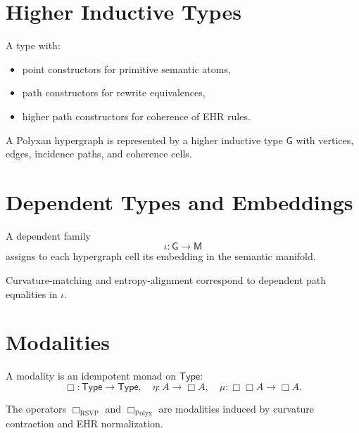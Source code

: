 \section{Higher Inductive Types}

\begin{definition}
A type with:
\begin{itemize}
\item point constructors for primitive semantic atoms,
\item path constructors for rewrite equivalences,
\item higher path constructors for coherence of EHR rules.
\end{itemize}
\end{definition}

\begin{proposition}
A Polyxan hypergraph is represented by a higher inductive type $\mathsf{G}$ with vertices, edges, incidence paths, and coherence cells.
\end{proposition}

\section{Dependent Types and Embeddings}

\begin{definition}
A dependent family
\[
\iota : \mathsf{G} \to \mathsf{M}
\]
assigns to each hypergraph cell its embedding in the semantic manifold.
\end{definition}

\begin{proposition}
Curvature-matching and entropy-alignment correspond to dependent path equalities in $\iota$.
\end{proposition}

\section{Modalities}

\begin{definition}[Modality]
A modality is an idempotent monad on $\mathsf{Type}$:
\[
\Box : \mathsf{Type}\to\mathsf{Type},
\quad \eta : A \to \Box A,
\quad \mu : \Box\Box A \to \Box A.
\]
\end{definition}

\begin{proposition}
The operators $\Box_{\mathrm{RSVP}}$ and $\Box_{\mathrm{Polyx}}$ are modalities induced by curvature contraction and EHR normalization.
\end{proposition}

